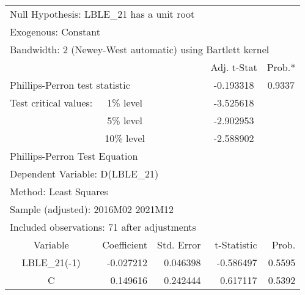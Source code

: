 \begin{tabular}{lrrrr}
\toprule
\multicolumn{3}{l}{Null Hypothesis: LBLE\_21 has a unit root}&\multicolumn{1}{c}{}&\multicolumn{1}{c}{}\\
\multicolumn{2}{l}{Exogenous: Constant}&\multicolumn{1}{c}{}&\multicolumn{1}{c}{}&\multicolumn{1}{c}{}\\
\multicolumn{5}{l}{Bandwidth: 2 (Newey-West automatic) using Bartlett kernel}\\
\midrule
\multicolumn{1}{c}{}&\multicolumn{1}{c}{}&\multicolumn{1}{c}{}&\multicolumn{1}{c}{Adj. t-Stat}&\multicolumn{1}{c}{Prob.*}\\
\midrule
\multicolumn{2}{l}{Phillips-Perron test statistic}&\multicolumn{1}{l}{}&\multicolumn{1}{c}{-0.193318}&\multicolumn{1}{c}{0.9337}\\
\multicolumn{1}{l}{Test critical values:}&\multicolumn{1}{c}{1\% level}&\multicolumn{1}{c}{}&\multicolumn{1}{c}{-3.525618}&\multicolumn{1}{c}{}\\
\multicolumn{1}{c}{}&\multicolumn{1}{c}{5\% level}&\multicolumn{1}{c}{}&\multicolumn{1}{c}{-2.902953}&\multicolumn{1}{c}{}\\
\multicolumn{1}{c}{}&\multicolumn{1}{c}{10\% level}&\multicolumn{1}{c}{}&\multicolumn{1}{c}{-2.588902}&\multicolumn{1}{c}{}\\
\midrule
\multicolumn{2}{l}{Phillips-Perron Test Equation}&\multicolumn{1}{c}{}&\multicolumn{1}{c}{}&\multicolumn{1}{c}{}\\
\multicolumn{3}{l}{Dependent Variable: D(LBLE\_21)}&\multicolumn{1}{c}{}&\multicolumn{1}{c}{}\\
\multicolumn{2}{l}{Method: Least Squares}&\multicolumn{1}{c}{}&\multicolumn{1}{c}{}&\multicolumn{1}{c}{}\\
\multicolumn{3}{l}{Sample (adjusted): 2016M02 2021M12}&\multicolumn{1}{c}{}&\multicolumn{1}{c}{}\\
\multicolumn{4}{l}{Included observations: 71 after adjustments}&\multicolumn{1}{c}{}\\
\midrule
\multicolumn{1}{c}{Variable}&\multicolumn{1}{r}{Coefficient}&\multicolumn{1}{r}{Std. Error}&\multicolumn{1}{r}{t-Statistic}&\multicolumn{1}{r}{Prob.}\\
\midrule
\multicolumn{1}{c}{LBLE\_21(-1)}&\multicolumn{1}{r}{-0.027212}&\multicolumn{1}{r}{0.046398}&\multicolumn{1}{r}{-0.586497}&\multicolumn{1}{r}{0.5595}\\
\multicolumn{1}{c}{C}&\multicolumn{1}{r}{0.149616}&\multicolumn{1}{r}{0.242444}&\multicolumn{1}{r}{0.617117}&\multicolumn{1}{r}{0.5392}\\

\end{tabular}
